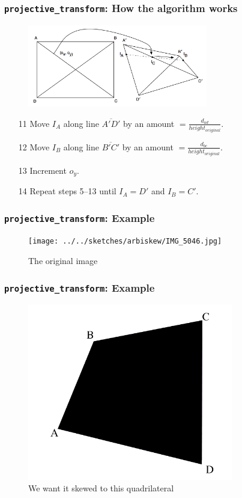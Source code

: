 \documentclass{beamer}
\begin{document}
\begin{frame}
	\frametitle{{\tt projective\_transform}: How the algorithm works}
	\begin{figure}
		\centering
		\includegraphics[width=0.7\textwidth]{images/arbiskew_graphic_with_iterators3.png}
	\end{figure}
	\begin{enumerate}
	\item[11] Move $I_A$ along line $\overline{A\prime D\prime}$ by an amount $= \frac{d_{ad}}{height_{original}}$.
	\item[12] Move $I_B$ along line $\overline{B\prime C\prime}$ by an amount $= \frac{d_{bc}}{height_{original}}$.
	\item[13] Increment $o_y$.
	\item[14] Repeat steps 5--13 until $I_A = D\prime$ and $I_B = C\prime$.
	\end{enumerate}
\end{frame}

\begin{frame}
	\frametitle{{\tt projective\_transform}: Example}
	\begin{figure}
		\centering
		\texttt{[image: ../../sketches/arbiskew/IMG\_5046.jpg]}
		\caption{The original image}
	\end{figure}
\end{frame}

\begin{frame}
	\frametitle{{\tt projective\_transform}: Example}
	\begin{figure}
		\centering
		\includegraphics[width=0.8\textwidth]{images/skew_example/skew_rectangle.png}
		\caption{We want it skewed to this quadrilateral}
	\end{figure}
\end{frame}
\end{document}
